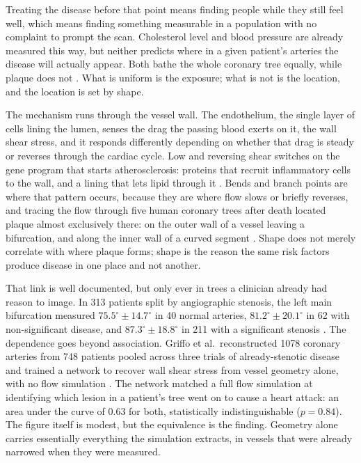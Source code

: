 Treating the disease before that point means finding people while they still feel well, which means
finding something measurable in a population with no complaint to prompt the scan.
Cholesterol level and blood pressure are already measured this way, but neither predicts where in a
given patient's arteries the disease will actually appear.
Both bathe the whole coronary tree equally, while plaque does not \cite{chatzizisis2007ess}.
What is uniform is the exposure; what is not is the location, and the location is set by shape.

The mechanism runs through the vessel wall.
The endothelium, the single layer of cells lining the lumen, senses the drag the passing blood
exerts on it, the wall shear stress, and it responds differently depending on whether that drag is
steady or reverses through the cardiac cycle.
Low and reversing shear switches on the gene program that starts atherosclerosis: proteins that
recruit inflammatory cells to the wall, and a lining that lets lipid through it \cite{chatzizisis2007ess}.
Bends and branch points are where that pattern occurs, because they are where flow slows or briefly
reverses, and tracing the flow through five human coronary trees after death located plaque almost
exclusively there: on the outer wall of a vessel leaving a bifurcation, and along the inner wall of a
curved segment \cite{asakura1990flow}.
Shape does not merely correlate with where plaque forms; shape is the reason the same risk factors
produce disease in one place and not another.

That link is well documented, but only ever in trees a clinician already had reason to image.
In 313 patients split by angiographic stenosis, the left main bifurcation measured
$75.5^\circ \pm 14.7^\circ$ in 40 normal arteries, $81.2^\circ \pm 20.1^\circ$ in 62 with
non-significant disease, and $87.3^\circ \pm 18.8^\circ$ in 211 with a significant stenosis
\cite{juan2017bifurcation}.
The dependence goes beyond association.
Griffo et al.\ reconstructed 1078 coronary arteries from 748 patients pooled across three trials of
already-stenotic disease and trained a network to recover wall shear stress from vessel geometry
alone, with no flow simulation \cite{griffo2026wss}.
The network matched a full flow simulation at identifying which lesion in a patient's tree went on
to cause a heart attack: an area under the curve of 0.63 for both, statistically indistinguishable
($p=0.84$).
The figure itself is modest, but the equivalence is the finding.
Geometry alone carries essentially everything the simulation extracts, in vessels that were already
narrowed when they were measured.

